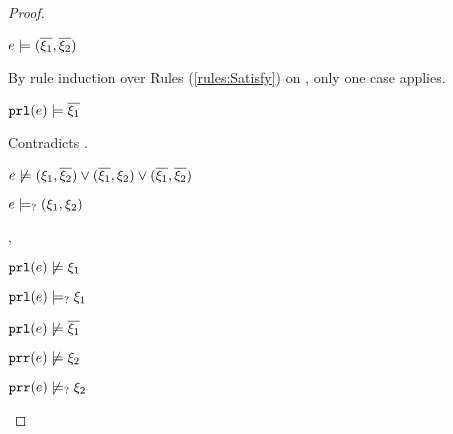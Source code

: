 \begin{proof}
\begin{byCases}
\begin{byCases}
\begin{byCases}
\begin{byCases}
\begin{byCases}
                    \begin{pfsteps*}
                    \item $e \models (\overline{\xi_1} , \overline{\xi_2})$  
                    \end{pfsteps*}
                    By rule induction over Rules (\ref{rules:Satisfy}) on , only one case applies.
                    \begin{byCases}
                    \item[\text{(\ref{rule:CSNotValPair})}]
                        \begin{pfsteps*}
                        \item $\mathtt{prl}(e) \models \overline{\xi_1}$ 
                        \end{pfsteps*}
                        Contradicts .
                    \end{byCases}
                \end{byCases}
            \end{byCases}
            \begin{pfsteps*}
            \item $e \not\models (\xi_1 , \overline{\xi_2}) \vee (\overline{\xi_1} , \xi_2) \vee (\overline{\xi_1} , \overline{\xi_2})$  
            \item $e \models_{?} (\xi_1 , \xi_2)$ 
            \end{pfsteps*}
        \item[\cmaysatisfy{\hprl{e}}{\xi_1},\csatisfy{\hprr{e}}{\cdual{\xi_2}}]
            \begin{pfsteps*}
            \item $\mathtt{prl}(e) \not\models \xi_1$  
            \item $\mathtt{prl}(e) \models_{?} \xi_1$  
            \item $\mathtt{prl}(e) \not\models \overline{\xi_1}$  
            \item $\mathtt{prr}(e) \not\models \xi_2$  
            \item $\mathtt{prr}(e) \not\models_{?} \xi_2$  

\end{pfsteps*}
\end{byCases}
\end{byCases}
\end{byCases}
\end{proof}
